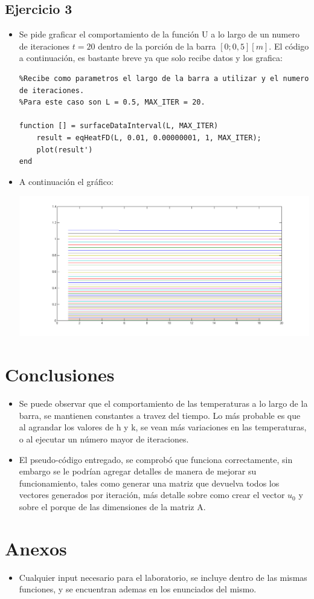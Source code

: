 \documentclass[letter, 10pt]{article}
\begin{document}
\subsection{Ejercicio 3}
\begin{itemize}
\item Se pide graficar el comportamiento de la funci\'on U a lo largo de un numero de iteraciones $t=20$ dentro de la porci\'on de la barra $[0;0,5][m]$. El c\'odigo a continuaci\'on, es bastante breve ya que solo recibe datos y los grafica:

\begin{lstlisting}
%Recibe como parametros el largo de la barra a utilizar y el numero de iteraciones.
%Para este caso son L = 0.5, MAX_ITER = 20.

function [] = surfaceDataInterval(L, MAX_ITER)
	result = eqHeatFD(L, 0.01, 0.00000001, 1, MAX_ITER);
	plot(result')
end
\end{lstlisting}

\item  A continuaci\'on el gr\'afico:

\begin{center}
\includegraphics[width=18cm]{grafico2.png}
\end{center}
\end{itemize}

\newpage

\section{ Conclusiones }
\begin{itemize}
\item Se puede observar que el comportamiento de las temperaturas a lo largo de la barra, se mantienen constantes a travez del tiempo. Lo m\'as probable es que al agrandar los valores de h y k, se vean m\'as variaciones en las temperaturas, o al ejecutar un n\'umero mayor de iteraciones.
\item El pseudo-c\'odigo entregado, se comprob\'o que funciona correctamente, sin embargo se le podr\'ian agregar detalles de manera de mejorar su funcionamiento, tales como generar una matriz que devuelva todos los vectores generados por iteraci\'on, m\'as detalle sobre como crear el vector $u_0$ y sobre el porque de las dimensiones de la matriz A.
\end{itemize}

\section{ Anexos }
\begin{itemize}
\item Cualquier input necesario para el laboratorio, se incluye dentro de las mismas funciones, y se encuentran ademas en los enunciados del mismo.
\end{itemize}
\end{document}
